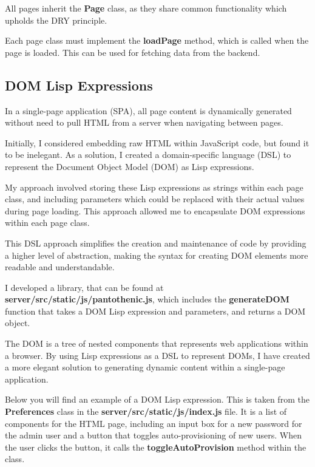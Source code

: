 All pages inherit the \textbf{Page} class,
as they share common functionality which upholds the DRY principle.


Each page class must implement the \textbf{loadPage} method,
which is called when the page is loaded.
This can be used for fetching data from the backend.


\subsection{DOM Lisp Expressions}
In a single-page application (SPA), all page content is dynamically generated without
need to pull HTML from a server when navigating between pages.

Initially, I considered embedding raw HTML within JavaScript code,
but found it to be inelegant.
As a solution, I created a domain-specific language (DSL)
to represent the Document Object Model (DOM) as Lisp expressions.

My approach involved storing these Lisp expressions as strings within each page class,
and including parameters which could be replaced with their actual values during page loading.
This approach allowed me to encapsulate DOM expressions within each page class.

This DSL approach simplifies the creation and maintenance of code by providing a higher level of abstraction,
making the syntax for creating DOM elements more readable and understandable.

I developed a library, that can be found at \textbf{server/src/static/js/pantothenic.js},
which includes the \textbf{generateDOM} function that takes a
DOM Lisp expression and parameters,
and returns a DOM object.

The DOM is a tree of nested components that represents web applications within a browser.
By using Lisp expressions as a DSL to represent DOMs,
I have created a more elegant solution to generating dynamic
content within a single-page application.

Below you will find an example of a DOM Lisp expression.
This is taken from the \textbf{Preferences} class in the
\textbf{server/src/static/js/index.js} file.
It is a list of components for the HTML page,
including an input box for a new password for the admin user
and a button that toggles auto-provisioning of new users.
When the user clicks the button, it calls the
\textbf{toggleAutoProvision} method within the class.

